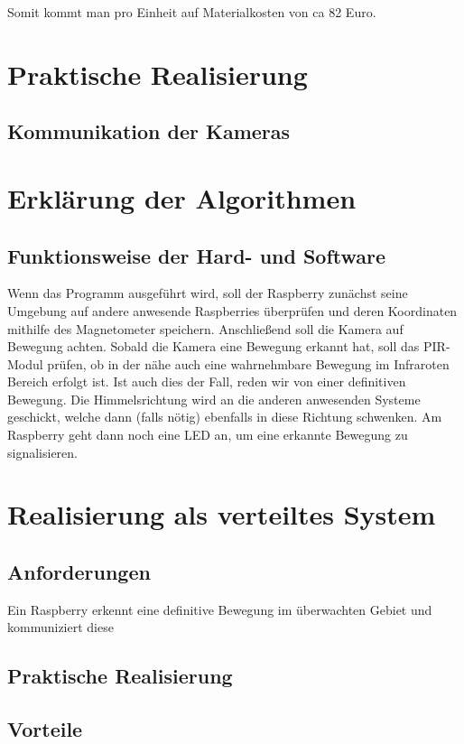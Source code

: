 \documentclass[12pt,a4paper]{scrreprt}
\begin{document}
Somit kommt man pro Einheit auf Materialkosten von ca 82 Euro.


\chapter{Praktische Realisierung}
\section{Kommunikation der Kameras}


\chapter{Erklärung der Algorithmen}
\section{Funktionsweise der Hard- und Software}
Wenn das Programm ausgeführt wird, soll der Raspberry zunächst seine Umgebung auf andere anwesende Raspberries überprüfen und deren Koordinaten mithilfe des Magnetometer speichern. Anschließend soll die Kamera auf Bewegung achten. Sobald die Kamera eine Bewegung erkannt hat, soll das PIR-Modul prüfen, ob in der nähe auch eine wahrnehmbare Bewegung im Infraroten Bereich erfolgt ist. Ist auch dies der Fall, reden wir von einer definitiven Bewegung. Die Himmelsrichtung wird an die anderen anwesenden Systeme geschickt, welche dann (falls nötig) ebenfalls in diese Richtung schwenken. Am Raspberry geht dann noch eine LED an, um eine erkannte Bewegung zu signalisieren. 


\chapter{Realisierung als verteiltes System}
\section{Anforderungen}
Ein Raspberry erkennt eine definitive Bewegung im überwachten Gebiet und kommuniziert diese 

\section{Praktische Realisierung}

\section{Vorteile}
\end{document}
